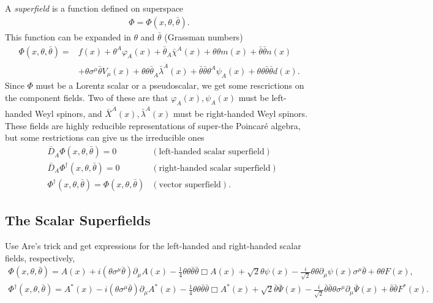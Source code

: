 \documentclass[twoside,english]{uiofysmaster}
\begin{document}
A \textit{superfield} is a function defined on superspace
\begin{align}
\Phi = \Phi (x, \theta, \bar{\theta}).
\end{align}
This function can be expanded in $\theta$ and $\bar{\theta}$ (Grassman numbers)
\begin{align}
\Phi(x, \theta, \bar{\theta}) =& f(x) + \theta^A \varphi_A (x) + \bar{\theta}_{\dot{A}} \bar{\chi}^{\dot{A}} (x) + \theta \theta m(x) + \bar{\theta} \bar{\theta} n(x)\\
&+ \theta \sigma^{\mu} \bar{\theta} V_{\mu} (x) + \theta \theta \bar{\theta}_{\dot{A}} \bar{\lambda}^{\dot{A}} (x) + \bar{\theta} \bar{\theta} \theta^A \psi_A (x) + \theta \theta \bar{\theta} \bar{\theta} d(x).
\end{align}
Since $\Phi$ must be a Lorentz scalar or a pseudoscalar, we get some rescrictions on the component fields. Two of these are that $\varphi_A (x), \psi_A(x)$ must be left-handed Weyl spinors, and $\bar{X}^{\dot{A}}(x), \bar{\lambda}^{\dot{A}}(x)$ must be right-handed Weyl spinors. These fields are highly reducible representations of super-the Poincar\'{e} algebra, but some restrictions can give us the irreducible ones
\begin{align}
&\bar{D}_{\dot{A}} \Phi (x, \theta, \bar{\theta}) = 0 &(\text{left-handed scalar superfield})\\
&\bar{D}_{A} \Phi^{\dagger} (x, \theta, \bar{\theta}) = 0 &(\text{right-handed scalar superfield})\\
& \Phi^{\dagger} (x, \theta, \bar{\theta}) = \Phi (x, \theta, \bar{\theta}) & (\text{vector superfield}).
\end{align}

\subsection*{The Scalar Superfields}

Use Are's trick and get expressions for the left-handed and right-handed scalar fields, respectively,
\begin{align}
\Phi (x, \theta, \bar{\theta}) = A(x) + i (\theta \sigma^{\mu} \bar{\theta}) \partial_{\mu} A(x) - \frac{1}{4} \theta \theta \bar{\theta} \bar{\theta} \Box A(x) + \sqrt{2} \theta \psi (x) - \frac{i}{\sqrt{2}} \theta \theta \partial_{\mu} \psi (x) \sigma^{\mu} \bar{\theta} + \theta \theta F(x),\\
\Phi^{\dagger} (x, \theta, \bar{\theta}) = A^*(x) - i (\theta \sigma^{\mu} \bar{\theta}) \partial_{\mu} A^*(x) - \frac{1}{4} \theta \theta \bar{\theta} \bar{\theta} \Box A^*(x) + \sqrt{2} \bar{\theta} \bar{\Psi} (x) - \frac{i}{\sqrt{2}} \bar{\theta} \bar{\theta} \theta \sigma^{\mu} \partial_{\mu} \bar{\Psi} (x)  + \bar{\theta} \bar{\theta} F^*(x).
\end{align}
\end{document}
